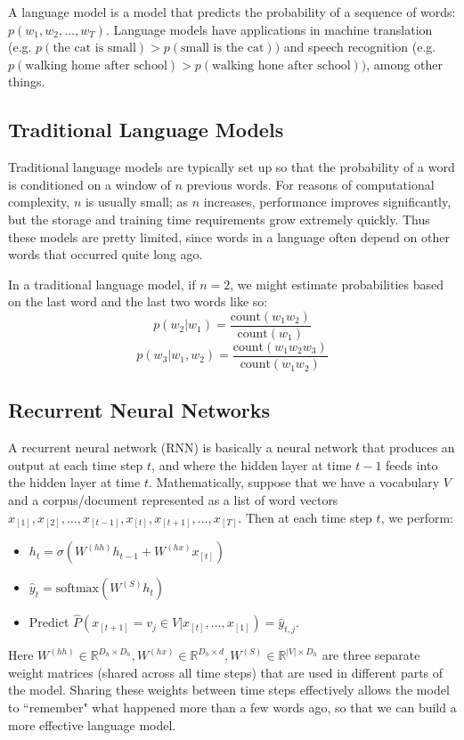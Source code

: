 A language model is a model that predicts the probability of a sequence of words: $p(w_1, w_2, \dots, w_T)$. Language models have applications in machine translation (e.g. $p(\text{the cat is small}) > p(\text{small is the cat}))$ and speech recognition (e.g. $p(\text{walking home after school}) > p(\text{walking hone after school}))$, among other things. 

\subsection{Traditional Language Models}
Traditional language models are typically set up so that the probability of a word is conditioned on a window of $n$ previous words. For reasons of computational complexity, $n$ is usually small; as $n$ increases, performance improves significantly, but the storage and training time requirements grow extremely quickly. Thus these models are pretty limited, since words in a language often depend on other words that occurred quite long ago.

In a traditional language model, if $n = 2$, we might estimate probabilities based on the last word and the last two words like so:
$$p(w_2 | w_1) = \frac{\text{count}(w_1w_2)}{\text{count}(w_1)}$$
$$p(w_3 | w_1, w_2) = \frac{\text{count}(w_1w_2w_3)}{\text{count}(w_1w_2)}$$

\subsection{Recurrent Neural Networks}
A recurrent neural network (RNN) is basically a neural network that produces an output at each time step $t$, and where the hidden layer at time $t-1$ feeds into the hidden layer at time $t$. Mathematically, suppose that we have a vocabulary $V$ and a corpus/document represented as a list of word vectors $x_{[1]}, x_{[2]}, \dots, x_{[t-1]}, x_{[t]}, x_{[t+1]}, \dots, x_{[T]}$. Then at each time step $t$, we perform:
\begin{itemize}
\item $h_t = \sigma(W^{(hh)}h_{t-1} + W^{(hx)}x_{[t]})$
\item $\hat{y}_t = \text{softmax}(W^{(S)}h_t)$
\item Predict $\hat{P}(x_{[t+1]} = v_j \in V | x_{[t]}, \dots, x_{[1]}) = \hat{y}_{t,j}$.
\end{itemize}
Here $W^{(hh)} \in \mathbb{R}^{D_h \times D_h}, W^{(hx)} \in \mathbb{R}^{D_h \times d}, W^{(S)} \in \mathbb{R}^{|V| \times D_h}$ are three separate weight matrices (shared across all time steps) that are used in different parts of the model. Sharing these weights between time steps effectively allows the model to ``remember" what happened more than a few words ago, so that we can build a more effective language model.

